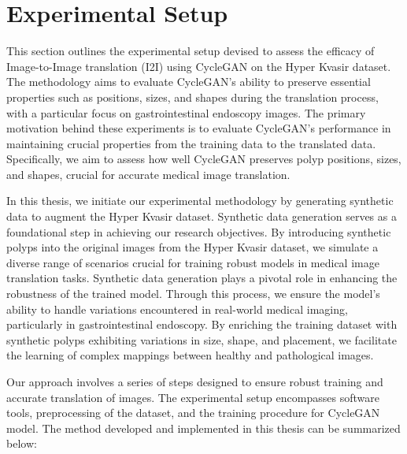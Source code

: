 \documentclass[UKenglish,12pt]{master-style}
\begin{document}
\section{Experimental Setup}

This section outlines the experimental setup devised to assess the efficacy of Image-to-Image translation (I2I) using CycleGAN \cite{CycleGAN} on the Hyper Kvasir dataset. The methodology aims to evaluate CycleGAN's ability to preserve essential properties such as positions, sizes, and shapes during the translation process, with a particular focus on gastrointestinal endoscopy images. The primary motivation behind these experiments is to evaluate CycleGAN's performance in maintaining crucial properties from the training data to the translated data. Specifically, we aim to assess how well CycleGAN preserves polyp positions, sizes, and shapes, crucial for accurate medical image translation.

In this thesis, we initiate our experimental methodology by generating synthetic data to augment the Hyper Kvasir dataset. Synthetic data generation serves as a foundational step in achieving our research objectives. By introducing synthetic polyps into the original images from the Hyper Kvasir dataset, we simulate a diverse range of scenarios crucial for training robust models in medical image translation tasks. Synthetic data generation plays a pivotal role in enhancing the robustness of the trained model. Through this process, we ensure the model's ability to handle variations encountered in real-world medical imaging, particularly in gastrointestinal endoscopy. By enriching the training dataset with synthetic polyps exhibiting variations in size, shape, and placement, we facilitate the learning of complex mappings between healthy and pathological images.

Our approach involves a series of steps designed to ensure robust training and accurate translation of images. The experimental setup encompasses software tools, preprocessing of the dataset, and the training procedure for CycleGAN model. The method developed and implemented in this thesis can be summarized below:
\end{document}
